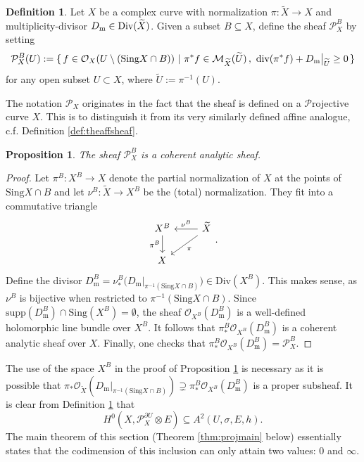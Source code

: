\documentclass[11pt]{amsart}
\newtheorem{prop}[theorem]{Proposition}
\theoremstyle{definition}
\newtheorem{definition}[theorem]{Definition}
\begin{document}
\begin{definition}\label{def:thesheaf}
     Let $X$ be a complex curve with normalization $\pi : \widetilde{X} \to X$ and multiplicity-divisor $D_\text{\normalfont m} \in \text{\normalfont Div}(\widetilde{X})$. Given a subset $B \subseteq X$, define the sheaf $\mathcal{P}_X^B$ by setting
     $$\mathcal{P}_X^B(U) := \{ \, f\in \mathcal{O}_X(U \setminus (\text{Sing}X \cap B)) \ | \ \pi^*f \in \mathcal{M}_{\widetilde X}(\widetilde{U}) \, , \ \text{\normalfont div}(\pi^*f) +D_\text{\normalfont m}\big|_{\widetilde{U}} \geq 0 \, \}$$
     for any open subset $U \subset X$, where $\widetilde{U}:=\pi^{-1}(U)$.
\end{definition}

\noindent The notation $\mathcal{P}_X$ originates in the fact that the sheaf is defined on a $\mathcal{P}$rojective curve $X$. This is to distinguish it from its very similarly defined affine analogue, c.f. Definition \ref{def:theaffsheaf}.

\begin{prop}\label{prop:coherence}
    The sheaf $\mathcal{P}_X^B$ is a coherent analytic sheaf.
\end{prop}

\begin{proof}
    Let $\pi^B : X^B \to X$ denote the partial normalization of $X$ at the points of $\text{Sing}X \cap B$ and let $\nu^B : \widetilde{X} \to X^B$ be the (total) normalization. They fit into a commutative triangle
    \[\begin{tikzcd}
	{X^B} & {\widetilde{X}} \\
	X
	\arrow["{\pi^B}"', from=1-1, to=2-1]
	\arrow["{\nu^B}"', from=1-2, to=1-1]
	\arrow["\pi", from=1-2, to=2-1]
    \end{tikzcd}.\]
    Define the divisor $D_\text{m}^B = \nu^B_*\big(D_\text{m}\big|_{\pi^{-1}(\text{Sing}X \cap B)}\big) \in \text{Div}(X^B)$. This makes sense, as $\nu^B$ is bijective when restricted to $\pi^{-1}(\text{Sing}X\cap B)$. Since $\text{supp}(D_\text{m}^B) \cap \text{Sing}(X^B) = \emptyset$, the sheaf $\mathcal{O}_{X^B}(D_\text{m}^B)$ is a well-defined holomorphic line bundle over $X^B$. It follows that $\pi^B_*\mathcal{O}_{X^B}(D_\text{m}^B)$ is a coherent analytic sheaf over $X$. Finally, one checks that
    $\pi^B_*\mathcal{O}_{X^B}(D_\text{m}^B) = \mathcal{P}_X^B$.
\end{proof}

\noindent The use of the space $X^B$ in the proof of Proposition \ref{prop:coherence} is necessary as it is possible that $\pi_*\mathcal{O}_{\widetilde{X}}(D_\text{m}\big|_{\pi^{-1}(\text{Sing}X \cap B)}) \supsetneq \pi^B_*\mathcal{O}_{X^B}(D_\text{m}^B)$ is a proper subsheaf. It is clear from Definition \ref{def:thesheaf} that 
    $$H^0(X,\mathcal{P}_X^{\partial U}\otimes E) \subseteq A^2(U,\sigma, E, h ).$$
    The main theorem of this section (Theorem \ref{thm:projmain} below) essentially states that the codimension of this inclusion can only attain two values: $0$ and $\infty$.
\end{document}
